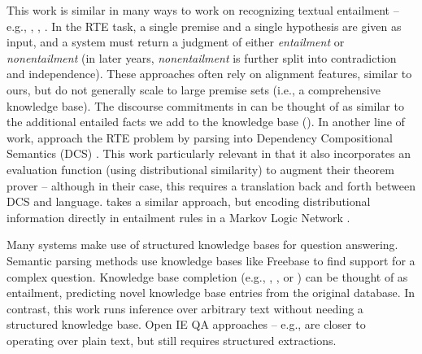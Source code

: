 This work is similar in many ways to work on 
  recognizing textual entailment -- e.g., 
  , ,
  .
In the RTE task, a single premise and a single hypothesis are given as input,
  and a system must return a judgment of either \textit{entailment} or
  \textit{nonentailment} (in later years, \textit{nonentailment} is further
  split into contradiction and independence).
These approaches often rely on alignment features, similar to ours, but
  do not generally scale to large premise sets (i.e., a comprehensive
  knowledge base).
The discourse commitments in  can be thought
  of as similar to the additional entailed facts we add to the
  knowledge base ().
In another line of work,  approach the RTE problem
  by parsing into Dependency Compositional Semantics (DCS)
  \cite{key:2011liang-semantics}.
This work  particularly relevant in that it also incorporates an evaluation
  function (using distributional similarity) to augment their theorem prover --
  although in their case, this requires a translation back and forth between
  DCS and language.
 takes a similar approach, but encoding
  distributional information directly in entailment rules in a Markov Logic
  Network \cite{key:2006richardson-mln}.

Many systems make use of structured knowledge bases for question
  answering.
Semantic parsing methods 
  \cite{key:2005zettlemoyer-semantics,key:2011liang-semantics}
  use knowledge bases like Freebase to find support for a
  complex question.
Knowledge base completion 
  (e.g., , ,
  or ) can be thought of as entailment,
  predicting novel knowledge base entries from the original database.
In contrast, this work runs inference over arbitrary text without
  needing a structured knowledge base.
Open IE \cite{key:2010wu-openie,key:2012mausam-ollie}
  QA approaches -- e.g., 
  are closer to operating over plain text, but
  still requires structured extractions.

